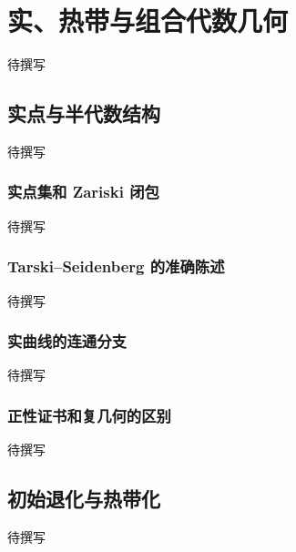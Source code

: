 
% 
% 
% 
% 
% 
% 

\chapter{实、热带与组合代数几何}
\label{g5:app:C}

待撰写

\section{实点与半代数结构}
\label{g5:sec:C01}
待撰写

\subsection{实点集和 Zariski 闭包}
\label{g5:subsec:C01:01}
待撰写

\subsection{Tarski–Seidenberg 的准确陈述}
\label{g5:subsec:C01:02}
待撰写

\subsection{实曲线的连通分支}
\label{g5:subsec:C01:03}
待撰写

\subsection{正性证书和复几何的区别}
\label{g5:subsec:C01:04}
待撰写

\section{初始退化与热带化}
\label{g5:sec:C02}
待撰写

